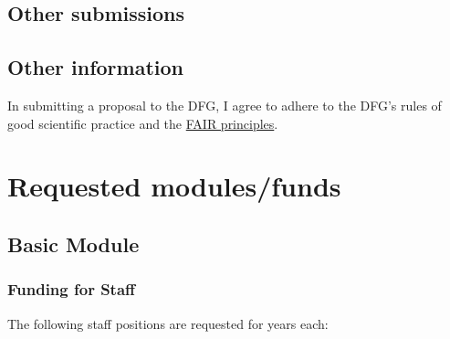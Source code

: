 \documentclass[final]{scrartcl}
\begin{document}
\subsection{Other submissions}

\subsection{Other information}
In submitting a proposal to the DFG, I agree to adhere to the DFG's rules of good scientific practice and the \href{https://www.nature.com/articles/sdata201618}{FAIR principles}.

\section{Requested modules/funds}

\subsection{Basic Module}

\subsubsection{Funding for Staff}
\begin{funds}
The following staff positions are requested for  years each:


\end{funds}
\end{document}

